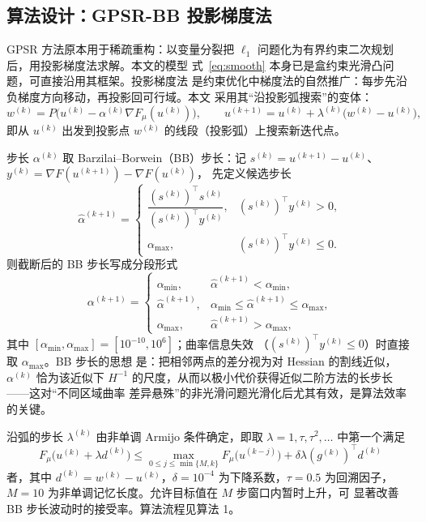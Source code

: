 \documentclass[withoutpreface,bwprint]{cumcmthesis}
\begin{document}
\subsection{算法设计：GPSR-BB 投影梯度法}

GPSR 方法原本用于稀疏重构：以变量分裂把
$\ell_1$ 问题化为有界约束二次规划后，用投影梯度法求解。本文的模型
式~\eqref{eq:smooth} 本身已是盒约束光滑凸问题，可直接沿用其框架。投影梯度法
是约束优化中梯度法的自然推广：每步先沿负梯度方向移动，再投影回可行域。本文
采用其``沿投影弧搜索''的变体：
\begin{equation}
  w^{(k)}=P\big(u^{(k)}-\alpha^{(k)}\nabla F_{\mu}(u^{(k)})\big),\qquad
  u^{(k+1)}=u^{(k)}+\lambda^{(k)}\big(w^{(k)}-u^{(k)}\big),
  \label{eq:pgd}
\end{equation}
即从 $u^{(k)}$ 出发到投影点 $w^{(k)}$ 的线段（投影弧）上搜索新迭代点。

步长 $\alpha^{(k)}$ 取 Barzilai--Borwein（BB）步长：记
$s^{(k)}=u^{(k+1)}-u^{(k)}$、$y^{(k)}=\nabla F(u^{(k+1)})-\nabla F(u^{(k)})$，
先定义候选步长
\[
  \widehat\alpha^{(k+1)}=
  \begin{cases}
    \dfrac{(s^{(k)})^{\!\top}s^{(k)}}{(s^{(k)})^{\!\top}y^{(k)}},
      & (s^{(k)})^{\!\top}y^{(k)}>0,\\[6pt]
    \alpha_{\max}, & (s^{(k)})^{\!\top}y^{(k)}\le0.
  \end{cases}
\]
则截断后的 BB 步长写成分段形式
\begin{equation}
  \alpha^{(k+1)}=
  \begin{cases}
    \alpha_{\min}, & \widehat\alpha^{(k+1)}<\alpha_{\min},\\[2pt]
    \widehat\alpha^{(k+1)}, &
      \alpha_{\min}\le\widehat\alpha^{(k+1)}\le\alpha_{\max},\\[2pt]
    \alpha_{\max}, & \widehat\alpha^{(k+1)}>\alpha_{\max},
  \end{cases}
  \label{eq:bb}
\end{equation}
其中 $[\alpha_{\min},\alpha_{\max}]=[10^{-10},10^{6}]$；曲率信息失效
（$(s^{(k)})^{\!\top}y^{(k)}\le0$）时直接取 $\alpha_{\max}$。BB 步长的思想
是：把相邻两点的差分视为对 Hessian 的割线近似，$\alpha^{(k)}$ 恰为该近似下
$H^{-1}$ 的尺度，从而以极小代价获得近似二阶方法的长步长——这对``不同区域曲率
差异悬殊''的非光滑问题光滑化后尤其有效，是算法效率的关键。

沿弧的步长 $\lambda^{(k)}$ 由非单调 Armijo 条件确定，即取
$\lambda=1,\tau,\tau^{2},\dots$ 中第一个满足
\begin{equation}
  F_{\mu}\big(u^{(k)}+\lambda d^{(k)}\big)\le
  \max_{0\le j\le \min\{M,k\}}F_{\mu}\big(u^{(k-j)}\big)+\delta\lambda(g^{(k)})^{\!\top}d^{(k)}
  \label{eq:armijo}
\end{equation}
者，其中 $d^{(k)}=w^{(k)}-u^{(k)}$，$\delta=10^{-4}$ 为下降系数，$\tau=0.5$
为回溯因子，$M=10$ 为非单调记忆长度。允许目标值在 $M$ 步窗口内暂时上升，可
显著改善 BB 步长波动时的接受率。算法流程见算法 1。
\end{document}
